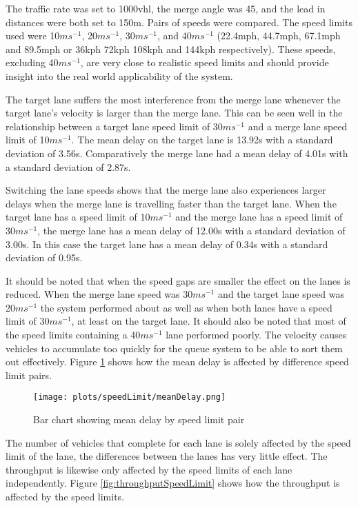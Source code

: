 The traffic rate was set to 1000\si{vhl}, the merge angle was 45\degree, and the lead in distances were both set to 150\si{m}. Pairs of speeds were compared. The speed limits used were 10$\si{ms^{-1}}$, 20$\si{ms^{-1}}$, 30$\si{ms^{-1}}$, and 40$\si{ms^{-1}}$ (22.4\si{mph}, 44.7\si{mph}, 67.1\si{mph} and 89.5\si{mph} or 36\si{kph} 72\si{kph} 108\si{kph} and 144\si{kph} respectively). These speeds, excluding 40$\si{ms^{-1}}$, are very close to realistic speed limits and should provide insight into the real world applicability of the system.

The target lane suffers the most interference from the merge lane whenever the target lane's velocity is larger than the merge lane. This can be seen well in the relationship between a target lane speed limit of 30$\si{ms^{-1}}$ and a merge lane speed limit of 10$\si{ms^{-1}}$. The mean delay on the target lane is 13.92\si{s} with a standard deviation of 3.56\si{s}. Comparatively the merge lane had a mean delay of 4.01\si{s} with a standard deviation of 2.87\si{s}. 

Switching the lane speeds shows that the merge lane also experiences larger delays when the merge lane is travelling faster than the target lane. When the target lane has a speed limit of 10$\si{ms^{-1}}$ and the merge lane has a speed limit of 30$\si{ms^{-1}}$, the merge lane has a mean delay of 12.00\si{s} with a standard deviation of 3.00\si{s}. In this case the target lane has a mean delay of 0.34\si{s} with a standard deviation of 0.95\si{s}.

It should be noted that when the speed gaps are smaller the effect on the lanes is reduced. When the merge lane speed was 30$\si{ms^{-1}}$ and the target lane speed was 20$\si{ms^{-1}}$ the system performed about as well as when both lanes have a speed limit of 30$\si{ms^{-1}}$, at least on the target lane. It should also be noted that most of the speed limits containing a 40$\si{ms^{-1}}$ lane performed poorly. The velocity causes vehicles to accumulate too quickly for the queue system to be able to sort them out effectively. Figure \ref{fig:meanDelaySpeedLimit} shows how the mean delay is affected by difference speed limit pairs.

\begin{figure}[htb]
\texttt{[image: plots/speedLimit/meanDelay.png]}
\caption{Bar chart showing mean delay by speed limit pair}
\label{fig:meanDelaySpeedLimit}
\end{figure}

The number of vehicles that complete for each lane is solely affected by the speed limit of the lane, the differences between the lanes has very little effect. The throughput is likewise only affected by the speed limits of each lane independently. Figure \ref{fig:throughputSpeedLimit} shows how the throughput is affected by the speed limits.

